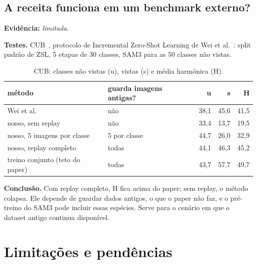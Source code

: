 \documentclass[11pt,a4paper]{article}
\newcommand{\evidencia}[1]{\noindent\textbf{Evidência:} \emph{#1}.\par}
\newcommand{\testes}{\noindent\textbf{Testes.} }
\newcommand{\conclusao}{\noindent\textbf{Conclusão.} }
\begin{document}
\subsection{A receita funciona em um benchmark externo?}
\evidencia{limitada}

\testes CUB~\cite{cub}, protocolo de Incremental Zero-Shot Learning de Wei et
al.~\cite{izsl}: split padrão de ZSL, 5 etapas de 30 classes, SAM3 para as 50
classes não vistas.

\begin{table}[H]
\centering\small
\caption{CUB: classes não vistas (u), vistas (s) e média harmônica (H).}
\begin{tabular}{llrrr}
\toprule
método & guarda imagens antigas? & u & s & H \\
\midrule
Wei et al. & não & 38,1 & 45,6 & 41,5 \\
nosso, sem replay & não & 33,4 & 13,7 & 19,5 \\
nosso, 5 imagens por classe & 5 por classe & 44,7 & 26,0 & 32,9 \\
nosso, replay completo & todas & 44,1 & 46,3 & 45,2 \\
treino conjunto (teto do paper) & todas & 43,7 & 57,7 & 49,7 \\
\bottomrule
\end{tabular}
\end{table}

\conclusao Com replay completo, H fica acima do paper; sem replay, o método
colapsa. Ele depende de guardar dados antigos, o que o paper não faz, e o
pré-treino do SAM3 pode incluir essas espécies. Serve para o cenário em que o
dataset antigo continua disponível.

\section{Limitações e pendências}
\end{document}
